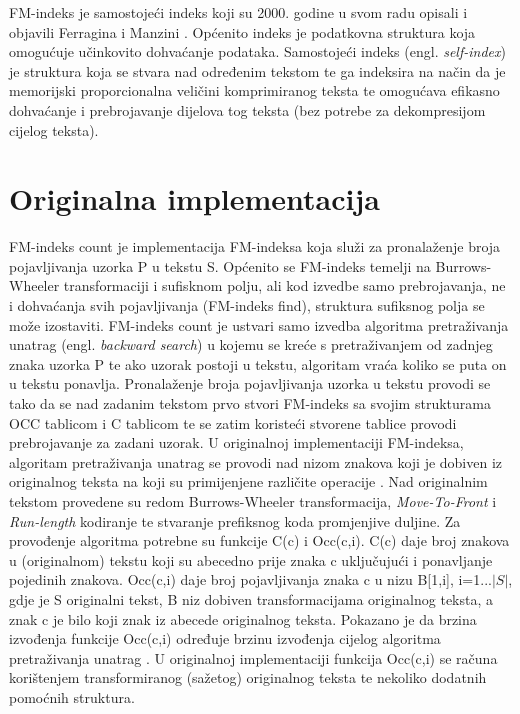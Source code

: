 FM-indeks je samostojeći indeks koji su 2000. godine u svom radu opisali i objavili Ferragina i Manzini \cite{fm1}. Općenito indeks je podatkovna struktura koja omogućuje učinkovito dohvaćanje podataka. Samostojeći indeks (engl. \emph{self-index}) je struktura koja se stvara nad određenim tekstom te ga indeksira na način da je memorijski proporcionalna veličini komprimiranog teksta te omogućava efikasno dohvaćanje i prebrojavanje dijelova tog teksta (bez potrebe za dekompresijom cijelog teksta).

\section{Originalna implementacija}
FM-indeks count je implementacija FM-indeksa koja služi za pronalaženje broja pojavljivanja uzorka P u tekstu S. Općenito se FM-indeks temelji na Burrows-Wheeler transformaciji i sufisknom polju, ali kod izvedbe samo prebrojavanja, ne i dohvaćanja svih pojavljivanja (FM-indeks find), struktura sufiksnog polja se može izostaviti.
FM-indeks count je ustvari samo izvedba algoritma pretraživanja unatrag  (engl. \emph{backward search}) u kojemu se kreće s pretraživanjem od zadnjeg znaka uzorka P te ako uzorak postoji u tekstu, algoritam vraća koliko se puta on u tekstu ponavlja.
Pronalaženje broja pojavljivanja uzorka u tekstu provodi se tako da se nad zadanim tekstom prvo stvori FM-indeks sa svojim strukturama OCC tablicom i C tablicom te se zatim koristeći stvorene tablice provodi prebrojavanje za zadani uzorak.
U originalnoj implementaciji FM-indeksa, algoritam pretraživanja unatrag se provodi nad nizom znakova koji je dobiven iz originalnog teksta na koji su primijenjene različite operacije \cite{fm1}. Nad originalnim tekstom provedene su redom Burrows-Wheeler transformacija, \emph{Move-To-Front} i \emph{Run-length} kodiranje te stvaranje prefiksnog koda promjenjive duljine.  Za provođenje algoritma potrebne su funkcije C(c) i Occ(c,i). C(c) daje broj znakova u (originalnom) tekstu koji su abecedno prije znaka c uključujući i ponavljanje pojedinih znakova. Occ(c,i) daje broj pojavljivanja znaka c u nizu B[1,i], i=1...$|S|$, gdje je S originalni tekst, B niz dobiven transformacijama originalnog teksta, a znak c je bilo koji znak iz abecede originalnog teksta. Pokazano je da brzina izvođenja funkcije Occ(c,i) određuje brzinu izvođenja cijelog algoritma pretraživanja unatrag \cite{fm2}. U originalnoj implementaciji funkcija Occ(c,i) se računa korištenjem transformiranog (sažetog) originalnog teksta te nekoliko dodatnih pomoćnih struktura. 



